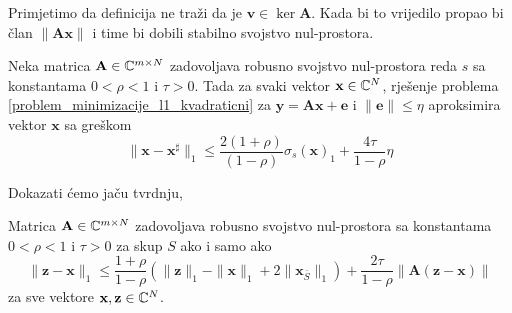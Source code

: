 \documentclass[a4paper,twoside,12pt]{memoir} %
\newcommand{\vect}[1]{\mathbf{#1}}
\renewcommand{\vec}{\vect}
\newcommand{\norm}[1]{\|{#1}\|}
\begin{document}
\noindent
Primjetimo da definicija ne tra\v{z}i da je $\vec v \in \ker \vec A$. Kada bi to vrijedilo propao bi \v{c}lan $\norm{\vec{Ax}}$ i time bi dobili stabilno svojstvo nul-prostora. 
\begin{thm}
    Neka matrica $\vec A \in \C^{m \times N}$ zadovoljava robusno svojstvo nul-prostora reda $s$ sa konstantama $0<\rho<1$ i $\tau > 0$. Tada za svaki vektor $\vec x \in \C^N$, rje\v{s}enje problema \eqref{problem_minimizacije_l1_kvadraticni} za $\vec y = \vec{Ax}+\vec{e}$ i $\norm{\vec e} \leq \eta$ aproksimira vektor $\vec x$ sa gre\v{s}kom
    \begin{equation*}
        \norm{\vec x - \vec x^{\sharp}}_1 \leq \frac{2(1+\rho)}{(1-\rho)} \sigma_s(\vec x)_1 + \frac{4 \tau}{1-\rho}\eta 
    \end{equation*}
\end{thm}
Dokazati \'cemo ja\v{c}u tvrdnju,
\begin{thm}\label{tm:4:20}
    Matrica $\vec A \in \C^{m \times N}$ zadovoljava robusno svojstvo nul-prostora sa konstantama $0<\rho<1$ i $\tau > 0$ za skup $S$ ako i samo ako
    \begin{equation}\label{robusno_tm2_nejed}
        \norm{\vec z - \vec x}_1 \leq \frac{1+\rho}{1-\rho} (\norm{\vec z}_1 - \norm{\vec x}_1 + 2 \norm{\vec x_{\bar S}}_1) + \frac{2 \tau}{1 - \rho} \norm{\vec A (\vec z - \vec x)}  
    \end{equation}
    za sve vektore $\vec x, \vec z \in \C^N$.
\end{thm}
\end{document}
